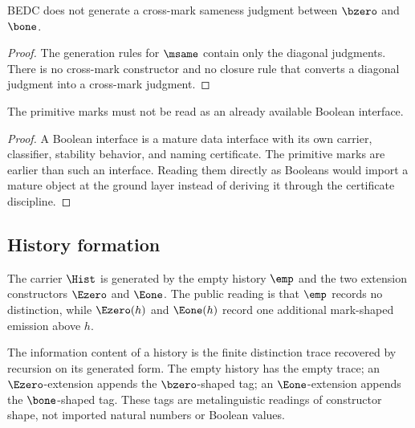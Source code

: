 \begin{theorem}
\label{thm:philosophy-mark-no-confusion}
BEDC does not generate a cross-mark sameness judgment between
\(\bzero\) and \(\bone\).
\end{theorem}
\begin{proof}
The generation rules for \(\msame\) contain only the diagonal judgments.
There is no cross-mark constructor and no closure rule that converts a
diagonal judgment into a cross-mark judgment.
\end{proof}

\begin{corollary}
\label{cor:philosophy-primitive-marks-not-booleans}
The primitive marks must not be read as an already available Boolean
interface.
\end{corollary}
\begin{proof}
A Boolean interface is a mature data interface with its own carrier,
classifier, stability behavior, and naming certificate. The primitive
marks are earlier than such an interface. Reading them directly as
Booleans would import a mature object at the ground layer instead of
deriving it through the certificate discipline.
\end{proof}


\subsection{History formation}
\label{subsec:history-formation}

\begin{definition}[Histories]
\label{def:philosophy-histories}
The carrier \(\Hist\) is generated by the empty history \(\emp\) and
the two extension constructors \(\Ezero\) and \(\Eone\). The public
reading is that \(\emp\) records no distinction, while
\(\Ezero(h)\) and \(\Eone(h)\) record one additional mark-shaped
emission above \(h\).
\end{definition}

\begin{definition}
\label{def:philosophy-history-information-content}
The information content of a history is the finite distinction trace
recovered by recursion on its generated form. The empty history has the
empty trace; an \(\Ezero\)-extension appends the \(\bzero\)-shaped tag;
an \(\Eone\)-extension appends the \(\bone\)-shaped tag. These tags are
metalinguistic readings of constructor shape, not imported natural
numbers or Boolean values.
\end{definition}

